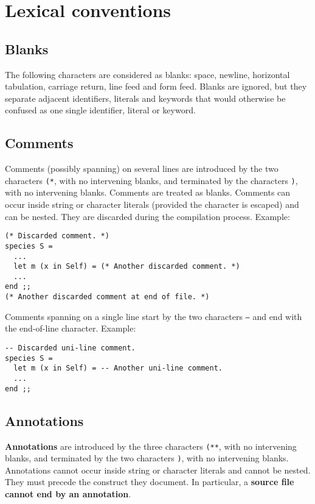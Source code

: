 

\section{Lexical conventions}

\subsection{Blanks}
The following characters are considered as blanks: space, newline,
horizontal tabulation, carriage return, line feed and form
feed. Blanks are ignored, but they separate adjacent identifiers,
literals and keywords that would otherwise be confused as one single
identifier, literal or keyword.

\subsection{Comments}
Comments (possibly spanning) on several lines are introduced by the
two characters {\tt (*}, with no intervening blanks, and terminated by
the characters {\tt *)}, with no intervening blanks. Comments are
treated as blanks. Comments can occur inside string or character
literals (provided the {\tt *} character is escaped) and can be nested. They
are discarded during the compilation process. Example:
{\scriptsize
\begin{lstlisting}
(* Discarded comment. *)
species S =
  ...
  let m (x in Self) = (* Another discarded comment. *)
  ...
end ;;
(* Another discarded comment at end of file. *)
\end{lstlisting}
}

Comments spanning on a single line start by the two characters
{\tt --} and end with the end-of-line character.
Example:
{\scriptsize
\begin{lstlisting}
-- Discarded uni-line comment.
species S =
  let m (x in Self) = -- Another uni-line comment.
  ...
end ;;
\end{lstlisting}
}

\subsection{Annotations}
\label{annotation}
{\bf Annotations} are introduced by the three characters {\tt (**},
with no intervening blanks, and terminated by the two characters
{\tt *)}, with no intervening blanks.
Annotations cannot occur inside string or character literals and
cannot be nested. They must precede the construct they document.
In particular, a {\bf source file cannot end by an annotation}.

